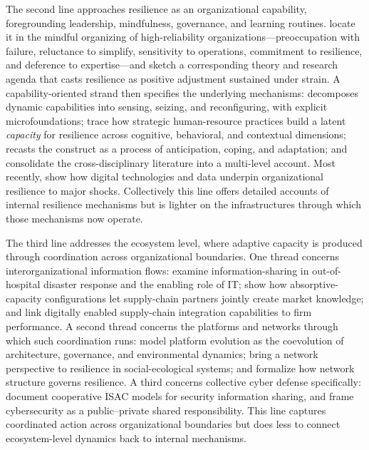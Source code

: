 The second line approaches resilience as an organizational capability, foregrounding leadership, mindfulness, governance, and learning routines. \textcite{weick2011managing} locate it in the mindful organizing of high-reliability organizations---preoccupation with failure, reluctance to simplify, sensitivity to operations, commitment to resilience, and deference to expertise---and \textcite{vogus2007organizational} sketch a corresponding theory and research agenda that casts resilience as positive adjustment sustained under strain. A capability-oriented strand then specifies the underlying mechanisms: \textcite{teece2007explicating} decomposes dynamic capabilities into sensing, seizing, and reconfiguring, with explicit microfoundations; \textcite{lengnick2011developing} trace how strategic human-resource practices build a latent \emph{capacity} for resilience across cognitive, behavioral, and contextual dimensions; \textcite{duchek2019organizational} recasts the construct as a process of anticipation, coping, and adaptation; and \textcite{bhamra2011resilience} consolidate the cross-disciplinary literature into a multi-level account. Most recently, \textcite{boh2023building} show how digital technologies and data underpin organizational resilience to major shocks. Collectively this line offers detailed accounts of internal resilience mechanisms but is lighter on the infrastructures through which those mechanisms now operate. 

The third line addresses the ecosystem level, where adaptive capacity is produced through coordination across organizational boundaries. One thread concerns interorganizational information flows: \textcite{arnold2004informationsharing} examine information-sharing in out-of-hospital disaster response and the enabling role of IT; \textcite{malhotra2005absorptive} show how absorptive-capacity configurations let supply-chain partners jointly create market knowledge; and \textcite{rai2006firm} link digitally enabled supply-chain integration capabilities to firm performance. A second thread concerns the platforms and networks through which such coordination runs: \textcite{tiwana2010research} model platform evolution as the coevolution of architecture, governance, and environmental dynamics; \textcite{janssen2006network} bring a network perspective to resilience in social-ecological systems; and \textcite{liu2022network} formalize how network structure governs resilience. A third concerns collective cyber defense specifically: \textcite{enisa2017isacs} document cooperative ISAC models for security information sharing, and \textcite{lostri2022shared} frame cybersecurity as a public--private shared responsibility. This line captures coordinated action across organizational boundaries but does less to connect ecosystem-level dynamics back to internal mechanisms.\\

